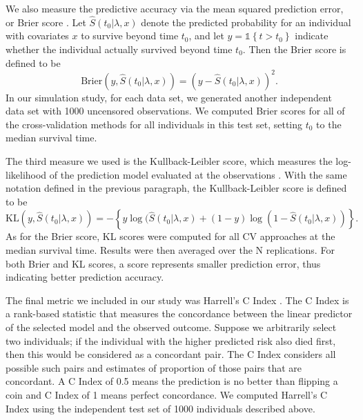 
\par We also measure the predictive accuracy via the mean squared prediction error, or Brier score \citep{VanHouwelingen2011}. Let $\hat{S}(t_0|\lambda,x)$ denote the predicted probability for an individual with covariates $x$ to survive beyond time $t_0$, and let $y = \mathbb{1}\left\{ t > t_{0}\right\}$ indicate whether the individual actually survived beyond time $t_0$. Then the Brier score is defined to be
\begin{equation}
\text{Brier}(y, \hat{S}(t_0|\lambda,x)) = (y - \hat{S}(t_0|\lambda,x))^2.
\end{equation}
In our simulation study, for each data set, we generated another independent data set with 1000 uncensored observations. We computed Brier scores for all of the cross-validation methods for all individuals in this test set, setting $t_0$ to the median survival time.

\par The third measure we used is the Kullback-Leibler score, which measures the log-likelihood of the prediction model evaluated at the observations \citep{VanHouwelingen2011}. With the same notation defined in the previous paragraph, the Kullback-Leibler score is defined to be
\begin{equation}
	\text{KL}(y, \hat{S}(t_0|\lambda,x)) = -\left\{ y\log(\hat{S}(t_0|\lambda,x) + (1 - y)\log(1 - \hat{S}(t_0|\lambda,x)) \right\}.
\end{equation}
As for the Brier score, KL scores were computed for all CV approaches at the median survival time.  Results were then averaged over the N replications. For both Brier and KL scores, a score represents smaller prediction error, thus indicating better prediction accuracy.

\par The final metric we included in our study was Harrell's C Index \citep{HarrellJr1984}. The C Index is a rank-based statistic that measures the concordance between the linear predictor of the selected model and the observed outcome. Suppose we arbitrarily select two individuals; if the individual with the higher predicted risk also died first, then this would be considered as a concordant pair. The C Index considers all possible such pairs and estimates of proportion of those pairs that are concordant. A C Index of 0.5 means the prediction is no better than flipping a coin and C Index of 1 means perfect concordance. We computed Harrell's C Index using the independent test set of 1000 individuals described above.

